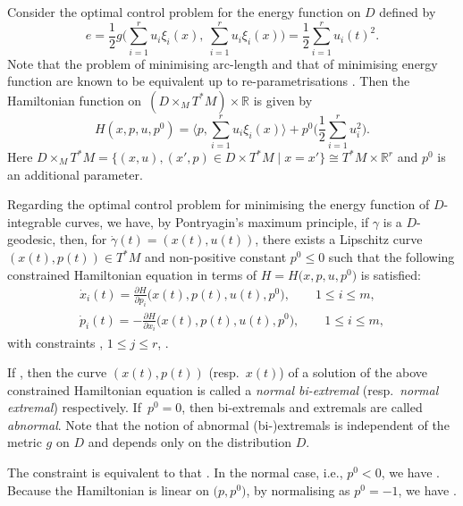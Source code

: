\documentclass[pdftex]{sigma}
\numberwithin{equation}{section}
\theoremstyle{definition}
\newcommand{\R}{\mathbb{R}}
\newcommand{\0}{\boldsymbol{0}}
\newcommand{\pa}{\partial}
\begin{document}
Consider the optimal control problem for the energy function on $D$ defined by
\[
e = \frac{1}{2} g\Biggl(\sum_{i=1}^r u_i \xi_i(x), \ \sum_{i=1}^r u_i \xi_i(x)\Biggr) = \frac{1}{2} \sum_{i=1}^r u_i(t)^2.
\]
Note that the problem of minimising arc-length and that of minimising energy function are known to be equivalent
up to re-parametrisations \cite{AS, Montgomery}.
Then the Hamiltonian function on~$(D \times_M T^*M) \times \R$ is given by
\[
H(x, p, u, p^0) = \Biggl\langle p, \sum_{i=1}^r u_i\xi_i(x)\Biggr\rangle + p^0\Biggl(\frac{1}{2}\sum_{i=1}^r u_i^2\Biggr).
\]
Here $D \times_M T^*M = \{ (x, u), (x', p) \in D\times T^*M \mid x = x'\} \cong T^*M \times \R^r$ and $p^0$ is an additional parameter.

Regarding the optimal control problem for minimising the energy function of $D$-integrable curves,
we have, by Pontryagin's maximum principle,
if $\gamma$ is a $D$-geodesic, then, for $\dot{\gamma}(t) = (x(t), u(t))$,
there exists a Lipschitz curve $(x(t), p(t)) \in T^*M$ and non-positive constant $p^0 \leq 0$
such that the following constrained Hamiltonian equation in terms of $H = H\bigl(x, p, u, p^0\bigr)$
is satisfied:
\begin{gather*}
\dot{x}_i(t) = \frac{\pa H}{\pa p_i}\bigl(x(t), p(t), u(t), p^0\bigr), \qquad 1 \leq i \leq m,
\\
\dot{p}_i(t) = - \frac{\pa H}{\pa x_i}\bigl(x(t), p(t), u(t), p^0\bigr), \qquad 1 \leq i \leq m,
\end{gather*}
with constraints
\smash{$\frac{\pa H}{\pa u_j}\bigl(x(t), p(t), u(t), p^0\bigr) = 0$}, $1 \leq j \leq r$, .

If , then
the curve $(x(t), p(t))$ (resp.\ $x(t)$)
of a solution of the above constrained Hamiltonian equation
is called a {\it normal bi-extremal}
(resp.\ {\it normal extremal}) respectively.
If~${p^0 = 0}$, then bi-extremals and extremals are called {\it abnormal}.
Note that the notion of abnormal \mbox{(bi-)extremals} is independent of the metric $g$ on $D$ and
depends only on the distribution $D$.

The constraint
\smash{$\frac{\pa H}{\pa u_j} = 0$} is equivalent to that
.
In the normal case, i.e., $p^0 < 0$, we have
. Because the Hamiltonian
is linear on $\bigl(p, p^0\bigr)$, by normalising as $p^0 = -1$, we have
.
\end{document}
